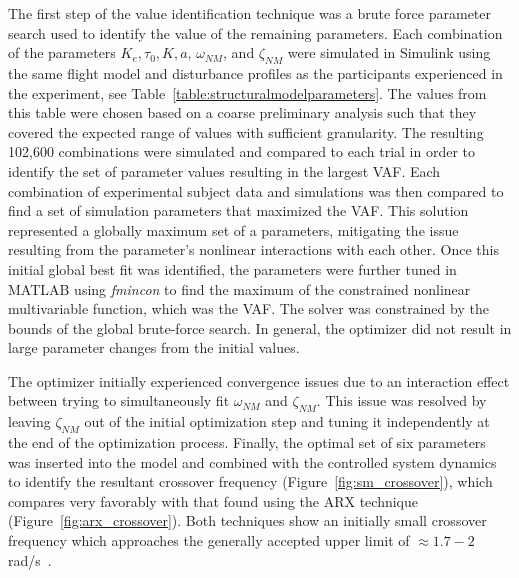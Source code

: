 The first step of the value identification technique was a brute force parameter search used to identify the value of the remaining parameters.
Each combination of the parameters $K_e, \tau_0, K, a$, $\omega_{NM}$, and $\zeta_{NM}$ were simulated in Simulink using the same flight model and disturbance profiles as the participants experienced in the experiment, see Table~\ref{table:structuralmodelparameters}.
The values from this table were chosen based on a coarse preliminary analysis such that they covered the expected range of values with sufficient granularity.
The resulting 102,600 combinations were simulated and compared to each trial in order to identify the set of parameter values resulting in the largest VAF.
Each combination of experimental subject data and simulations was then compared to find a set of simulation parameters that maximized the VAF.
This solution represented a globally maximum set of a parameters, mitigating the issue resulting from the parameter's nonlinear interactions with each other.
Once this initial global best fit was identified, the parameters were further tuned in MATLAB using \textit{fmincon} to find the maximum of the constrained nonlinear multivariable function, which was the VAF.
The solver was constrained by the bounds of the global brute-force search.
In general, the optimizer did not result in large parameter changes from the initial values.

The optimizer initially experienced convergence issues due to an interaction effect between trying to simultaneously fit $\omega_{NM}$ and $\zeta_{NM}$.
This issue was resolved by leaving $\zeta_{NM}$ out of the initial optimization step and tuning it independently at the end of the optimization process.
Finally, the optimal set of six parameters was inserted into the model and combined with the controlled system dynamics to identify the resultant crossover frequency (Figure~\ref{fig:sm_crossover}), which compares very favorably with that found using the ARX technique (Figure~\ref{fig:arx_crossover}).
Both techniques show an initially small crossover frequency which approaches the generally accepted upper limit of $\approx 1.7-2$ rad/s~\citep{hess1984analysis}.

